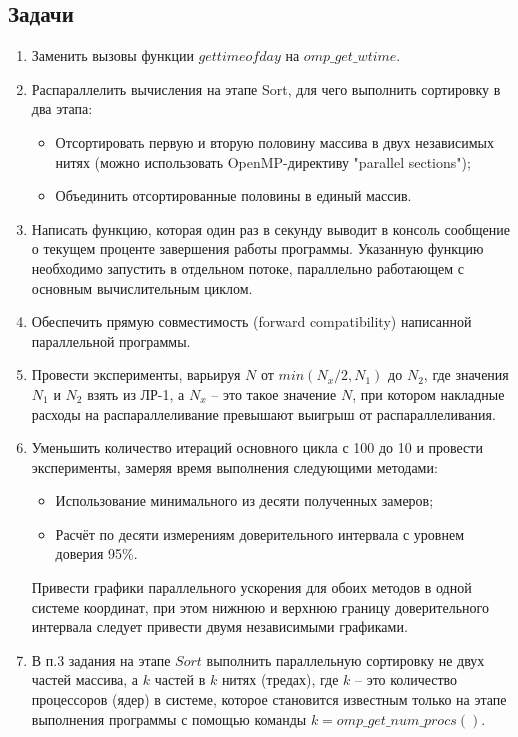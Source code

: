 \documentclass[14pt, a4paper, oneside, final]{extarticle}
\begin{document}
\subsection*{Задачи}
\begin{enumerate}
 \item Заменить вызовы функции $gettimeofday$ на $omp\_get\_wtime$.

 \item Распараллелить вычисления на этапе Sort, для чего выполнить сортировку в два этапа:
 \begin{itemize}
   \item Отсортировать первую и вторую половину массива в двух независимых нитях (можно использовать OpenMP-директиву "parallel sections");
   \item Объединить отсортированные половины в единый массив.
  \end{itemize}

 \item Написать функцию, которая один раз в секунду выводит в консоль сообщение о текущем проценте завершения работы программы. Указанную функцию необходимо запустить в отдельном потоке, параллельно работающем с основным вычислительным циклом.

 \item Обеспечить прямую совместимость (forward compatibility) написанной параллельной программы.

 \item Провести эксперименты, варьируя $N$ от $min(N_x/2, N_1)$ до $N_2$, где
значения $N_1$ и $N_2$ взять из ЛР-1, а $N_x$ – это такое значение $N$, при котором накладные расходы на распараллеливание превышают выигрыш от распараллеливания.

 \item Уменьшить количество итераций основного цикла с 100 до 10 и провести эксперименты, замеряя время выполнения следующими методами:
 \begin{itemize}
   \item Использование минимального из десяти полученных замеров;
   \item Расчёт по десяти измерениям доверительного интервала с уровнем доверия 95\%.
 \end{itemize}

 Привести графики параллельного ускорения для обоих методов в одной системе координат, при этом нижнюю и верхнюю границу доверительного интервала следует привести двумя независимыми графиками.

 \item В п.3 задания на этапе $Sort$ выполнить параллельную сортировку не двух частей массива, а $k$ частей в $k$ нитях (тредах), где $k$ – это количество процессоров (ядер) в системе, которое становится известным только на этапе выполнения программы с помощью команды $k = omp\_get\_num\_procs()$.
\end{enumerate}
\end{document}
